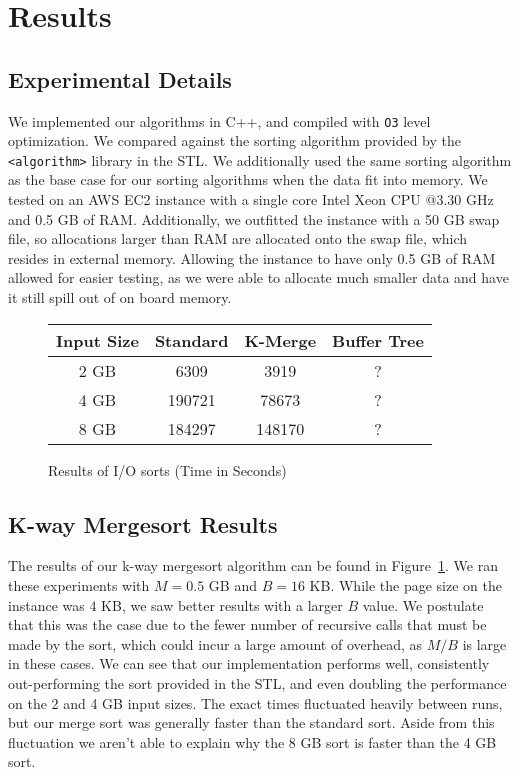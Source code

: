 \documentclass{article}
\begin{document}
\section{Results}

\subsection{Experimental Details}
We implemented our algorithms in C++, and compiled with \texttt{O3} level
optimization.
%
We compared against the sorting algorithm provided by the
\texttt{<algorithm>} library in the STL.
%
We additionally used the same sorting algorithm as the base case for our
sorting algorithms when the data fit into memory.
%
We tested on an AWS EC2 instance with a single core Intel Xeon CPU @3.30 GHz and 0.5 GB of RAM.
%
Additionally, we outfitted the instance with a 50 GB swap file, so allocations
larger than RAM are allocated onto the swap file, which resides in external memory.
%
Allowing the instance to have only 0.5 GB of RAM allowed for easier testing,
as we were able to allocate much smaller data and have it still spill out of
on board memory.

\begin{figure}
  \centering
  \begin{tabular}{|c|c|c|c|}
    \hline
    Input Size & Standard & K-Merge & Buffer Tree \\
    \hline
    \hline
    2 GB & 6309 & 3919 & ? \\
    \hline
    4 GB & 190721 & 78673 & ? \\
    \hline
    8 GB & 184297 & 148170 & ? \\
    \hline
  \end{tabular}
  \caption{Results of I/O sorts (Time in Seconds)}
  \label{res}
\end{figure}

\subsection{K-way Mergesort Results}


The results of our k-way mergesort algorithm can be found in Figure~\ref{res}.
%
We ran these experiments with $M = 0.5$ GB and $B = 16$ KB.
%
While the page size on the instance was $4$ KB, we saw better results with a larger $B$
value.
%
We postulate that this was the case due to the fewer number of recursive calls that must be
made by the sort, which could incur a large amount of overhead, as $M/B$ is large in these cases.
%
We can see that our implementation performs well, consistently out-performing the sort
provided in the STL, and even doubling the performance on the 2 and 4 GB input sizes.
%
The exact times fluctuated heavily between runs, but our merge sort was generally faster than the
standard sort.
%
Aside from this fluctuation we aren't able to explain why the 8 GB sort is faster than the 4 GB sort.
\end{document}
